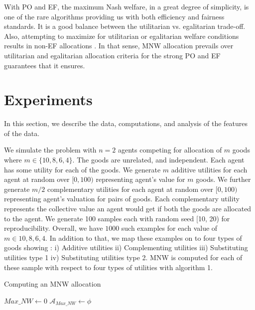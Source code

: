 With PO and EF, the maximum Nash welfare, in a great degree of simplicity, is one of the rare algorithms providing us with both efficiency and fairness standards. It is a good balance between the utilitarian vs. egalitarian trade-off. Also, attempting to maximize for utilitarian or egalitarian welfare conditions results in non-EF allocations \cite{caragiannis2016unreasonable}. In that sense, MNW allocation prevails over utilitarian and egalitarian allocation criteria for the strong PO and EF guarantees that it ensures.

\section{Experiments}
In this section, we describe the data, computations, and analysis of the features of the data.

We simulate the problem with $n = 2$ agents competing for allocation of $m$ goods where $m \in \{10, 8, 6, 4\}$. The goods are unrelated, and independent. Each agent has some utility for each of the goods. We generate $m$ additive utilities for each agent at random over $[0, 100)$ representing agent's value for $m$ goods. We further generate $m/2$ complementary utilities for each agent at random over $[0, 100)$ representing agent's valuation for pairs of goods. Each complementary utility represents the collective value an agent would get if both the goods are allocated to the agent. We generate 100 samples each with random seed [10, 20) for reproducibility. Overall, we have $1000$ such examples for each value of $m \in {10, 8, 6, 4}$. In addition to that, we map these examples on to four types of goods showing : i) Additive utilities ii) Complementing utilities iii) Substituting utilities type 1 iv) Substituting utilities type 2.  MNW is computed for each of these sample with respect to four types of utilities with algorithm 1.

\BlankLine

\begin{algorithm}
\caption{ Computing an MNW allocation }
\SetAlgoLined
{}
 $Max\_NW \leftarrow 0 $ \;
 $\mathcal{A}_{Max\_NW} \leftarrow \phi $ \;
\end{algorithm}

